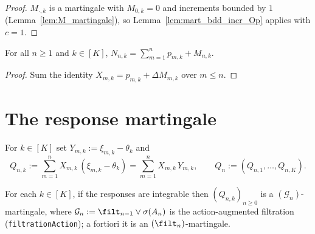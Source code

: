 \begin{proof}\leanok
{}
$M_{\cdot,k}$ is a martingale with $M_{0,k}=0$ and increments bounded by $1$
(Lemma~\ref{lem:M_martingale}), so Lemma~\ref{lem:mart_bdd_incr_Op} applies with
$c = 1$.
\end{proof}

\begin{lemma}\label{lem:count_decomp}
\leanok
{}
For all $n\ge1$ and $k\in[K]$,
$\displaystyle N_{n,k} = \sum_{m=1}^n p_{m,k} + M_{n,k}$.
\end{lemma}

\begin{proof}\leanok
Sum the identity $X_{m,k} = p_{m,k} + \Delta M_{m,k}$ over $m \le n$.
\end{proof}

\section{The response martingale}
\label{sec:aux_response}

\begin{definition}\label{def:Q}
\leanok
{}
For $k \in [K]$ set $Y_{m,k} := \xi_{m,k} - \theta_k$ and
\[
  Q_{n,k} := \sum_{m=1}^n X_{m,k}\,(\xi_{m,k} - \theta_k)
           = \sum_{m=1}^n X_{m,k}\,Y_{m,k},
  \qquad Q_n := (Q_{n,1}, \dots, Q_{n,K}).
\]
\end{definition}

\begin{lemma}[$Q$ is a martingale]\label{lem:Q_martingale}
\leanok
{}
For each $k \in [K]$, if the responses are integrable then $(Q_{n,k})_{n\ge0}$ is a
$(\mathcal{G}_n)$-martingale, where $\mathcal{G}_n := \filt_{n-1}\vee\sigma(A_n)$ is the
action-augmented filtration (\texttt{filtrationAction}); a fortiori it is an
$(\filt_n)$-martingale.
\end{lemma}


